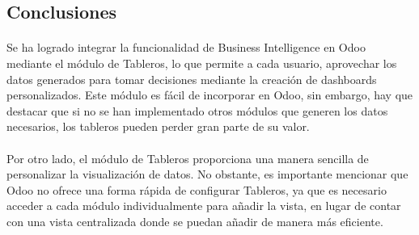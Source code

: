 \subsection{Conclusiones}
\paragraph{}
Se ha logrado integrar la funcionalidad de Business Intelligence en Odoo mediante el módulo de Tableros, lo que permite a cada usuario, aprovechar los datos generados para tomar decisiones mediante la creación de dashboards personalizados. Este módulo es fácil de incorporar en Odoo, sin embargo, hay que destacar que si no se han implementado otros módulos que generen los datos necesarios, los tableros pueden perder gran parte de su valor.
\paragraph{}
Por otro lado, el módulo de Tableros proporciona una manera sencilla de personalizar la visualización de datos. No obstante, es importante mencionar que Odoo no ofrece una forma rápida de configurar Tableros, ya que es necesario acceder a cada módulo individualmente para añadir la vista, en lugar de contar con una vista centralizada donde se puedan añadir de manera más eficiente.
